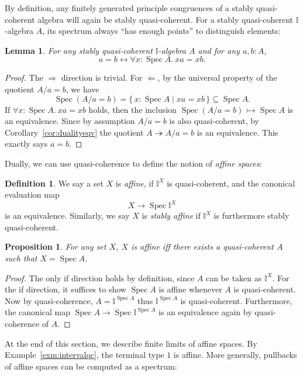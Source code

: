 \documentclass[12pt]{amsart}
\newtheorem{lemma}[theorem]{Lemma}
\newtheorem{proposition}[theorem]{Proposition}
\theoremstyle{definition}
\newtheorem{definition}[theorem]{Definition}
\newcommand{\mbb}[1]{\mathbb{#1}}
\newcommand{\I}{\mbb I}
\newcommand{\nt}{\Rightarrow}
\newcommand{\scomp}[2]{\{\,#1\mid#2\,\}}
\newcommand{\surj}{\twoheadrightarrow}
\newcommand{\inj}{\rightarrowtail}
\newcommand{\fa}[2]{\forall #1\!\colon\!\!#2.\ }
\newcommand{\eq}{\leftrightarrow}
\newcommand{\spec}{\operatorname{Spec}}
\begin{document}
By definition, any finitely generated principle congruences of a stably quasi-coherent algebra will again be stably quasi-coherent. For a stably quasi-coherent $\I$-algebra $A$,  its spectrum always ``has enough points'' to distinguish elements:

\begin{lemma}\label{lem:completeness}
  For any stably quasi-coherent $\I$-algebra $A$ and for any $a,b : A$,
  \[ a = b \eq \fa x{\spec A} xa = xb. \]
\end{lemma}
\begin{proof}
  The $\nt$ direction is trivial. For $\Leftarrow$, by the universal property of the quotient $A/a = b$, we have
  \[ \spec(A/a = b) = \scomp{x : \spec A}{xa = xb} \subseteq \spec A. \]
  If $\fa x{\spec A}xa = xb$ holds, then the inclusion $\spec(A/a = b) \inj \spec A$ is an equivalence. Since by assumption $A/a=b$ is also quasi-coherent, by Corollary~\ref{cor:dualityeqv} the quotient $A \surj A/a=b$ is an equivalence. This exactly says $a = b$.
\end{proof}

Dually, we can use quasi-coherence to define the notion of \emph{affine spaces}:

\begin{definition}
  We say a set $X$ is \emph{affine}, if $\I^X$ is quasi-coherent, and the canonical evaluation map
  \[ X \to \spec \I^X \]
  is an equivalence. Similarly, we say $X$ is \emph{stably affine} if $\I^X$ is furthermore stably quasi-coherent.
\end{definition}

\begin{proposition}
  For any set $X$, $X$ is affine iff there exists a quasi-coherent $A$ such that $X = \spec A$.
\end{proposition}
\begin{proof}
  The only if direction holds by definition, since $A$ can be taken as $\I^X$. For the if direction, it suffices to show $\spec A$ is affine whenever $A$ is quasi-coherent. Now by quasi-coherence, $A = \I^{\spec A}$ thus $\I^{\spec A}$ is quasi-coherent. Furthermore, the canonical map $\spec A \to \spec \I^{\spec A}$ is an equivalence again by quasi-coherence of $A$.
\end{proof}

At the end of this section, we describe finite limits of affine spaces. By Example~\ref{exm:intervalqc}, the terminal type $1$ is affine. More generally, pullbacks of affine spaces can be computed as a spectrum:
\end{document}
